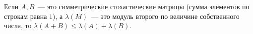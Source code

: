 Если $A, B$~--- это симметрические стохастические матрицы (сумма элементов по строкам равна $1$), а $\lambda(M)$~--- это
модуль второго по величине собственного числа, то $\lambda(A + B) \le \lambda(A) + \lambda(B)$.